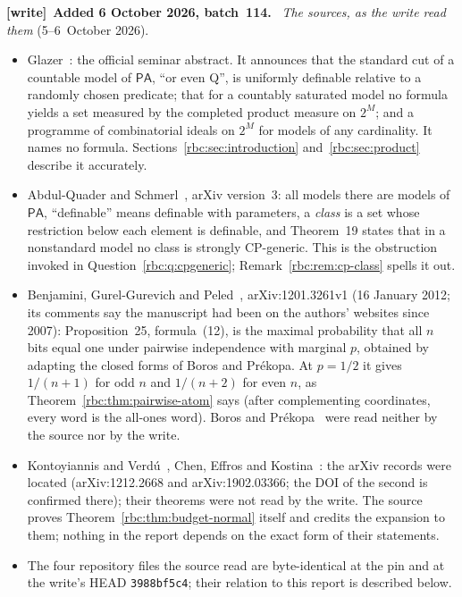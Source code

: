 \documentclass[11pt]{article}
\numberwithin{equation}{section}
\theoremstyle{definition}
\theoremstyle{remark}
\newcommand{\PA}{\mathsf{PA}}
\newcommand{\file}[1]{\nolinkurl{#1}}
\newenvironment{writenote}[1][]{\par\smallskip\begingroup\small
 \noindent\textbf{[write]}\if\relax\detokenize{#1}\relax\else~\textbf{#1.}\fi\ }%
 {\par\endgroup\smallskip}
\begin{document}
\begin{writenote}[Added 6 October 2026, batch~114]
\emph{The sources, as the write read them} (5--6~October 2026).
\begin{itemize}
\item Glazer~\cite{glazer2023}: the official seminar abstract. It announces
 that the standard cut of a countable model of $\PA$, ``or even Q'', is
 uniformly definable relative to a randomly chosen predicate; that for a
 countably saturated model no formula yields a set measured by the
 completed product measure on $2^M$; and a programme of combinatorial ideals
 on $2^M$ for models of any cardinality. It names no formula.
 Sections~\ref{rbc:sec:introduction} and~\ref{rbc:sec:product} describe it
 accurately.
\item Abdul-Quader and Schmerl~\cite{abdul-quader-schmerl}, arXiv
 version~3: all models there are models of $\PA$, ``definable'' means
 definable with parameters, a \emph{class} is a set whose restriction below
 each element is definable, and Theorem~19 states that in a nonstandard
 model no class is strongly CP-generic. This is the obstruction invoked in
 Question~\ref{rbc:q:cpgeneric}; Remark~\ref{rbc:rem:cp-class} spells it out.
\item Benjamini, Gurel-Gurevich and Peled~\cite{benjamini-gurel-peled},
 arXiv:1201.3261v1 (16 January 2012; its comments say the manuscript had
 been on the authors' websites since 2007): Proposition~25, formula~(12), is
 the maximal probability that all $n$ bits equal one under pairwise
 independence with marginal $p$, obtained by adapting the closed forms of
 Boros and Pr\'ekopa. At $p=1/2$ it gives $1/(n+1)$ for odd $n$ and
 $1/(n+2)$ for even $n$, as Theorem~\ref{rbc:thm:pairwise-atom} says (after
 complementing coordinates, every word is the all-ones word). Boros and
 Pr\'ekopa~\cite{boros-prekopa} were read neither by the source nor by the
 write.
\item Kontoyiannis and Verd\'u~\cite{kontoyiannis-verdu}, Chen, Effros and
 Kostina~\cite{chen-effros-kostina}: the arXiv records were located
 (arXiv:1212.2668 and arXiv:1902.03366; the DOI of the second is confirmed
 there); their theorems were not read by the write. The source proves
 Theorem~\ref{rbc:thm:budget-normal} itself and credits the expansion to
 them; nothing in the report depends on the exact form of their statements.
\item The four repository files the source read
 \cite{proveit-list,proveit-finite,proveit-beta,proveit-evaluator} are
 byte-identical at the pin and at the write's HEAD \file{3988bf5c4}; their
 relation to this report is described below.
\end{itemize}


\end{writenote}
\end{document}

